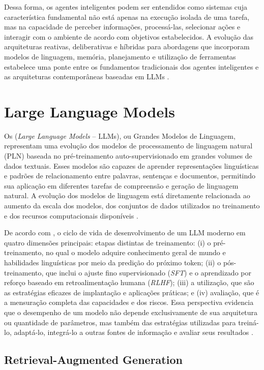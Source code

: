 Dessa forma, os agentes inteligentes podem ser entendidos como sistemas cuja
característica fundamental não está apenas na execução isolada de uma tarefa,
mas na capacidade de perceber informações, processá-las, selecionar ações e
interagir com o ambiente de acordo com objetivos estabelecidos. A evolução
das arquiteturas reativas, deliberativas e híbridas para abordagens que
incorporam modelos de linguagem, memória, planejamento e utilização de
ferramentas estabelece uma ponte entre os fundamentos tradicionais dos
agentes inteligentes e as arquiteturas contemporâneas baseadas em LLMs
\cite{muller1999,cheng2026}.

\section{Large Language Models}
\label{sec:llm}

Os (\textit{Large Language Models} -- LLMs), ou Grandes Modelos de Linguagem, representam uma evolução dos modelos de processamento de linguagem natural (PLN) baseada no pré-treinamento auto-supervisionado em grandes volumes de dados textuais. Esses modelos são capazes de aprender representações linguísticas e padrões de relacionamento entre palavras, sentenças e documentos, permitindo sua aplicação em diferentes tarefas de compreensão e geração de linguagem natural. A evolução dos modelos de linguagem está diretamente relacionada ao aumento da escala dos modelos, dos conjuntos de dados utilizados no treinamento e dos recursos computacionais disponíveis \cite{zhao2026survey}.

De acordo com , o ciclo de vida de desenvolvimento de um LLM moderno em quatro dimensões principais: etapas distintas de treinamento: (i) o pré-treinamento, no qual o modelo adquire conhecimento geral de mundo e habilidades linguísticas por meio da predição do próximo token; (ii) o pós-treinamento, que inclui o ajuste fino supervisionado (\textit{SFT}) e o aprendizado por reforço baseado em retroalimentação humana (\textit{RLHF}); (iii) a utilização, que são as estratégias eficazes de implantação e aplicações práticas; e (iv) avaliação, que é a mensuração completa das capacidades e dos riscos. Essa perspectiva evidencia que o desempenho de um modelo não depende exclusivamente de sua arquitetura ou quantidade de parâmetros, mas também das estratégias utilizadas para treiná-lo, adaptá-lo, integrá-lo a outras fontes de informação e avaliar seus resultados \cite{zhao2026survey}.


\subsection{Retrieval-Augmented Generation}
\label{subsec:rag}


